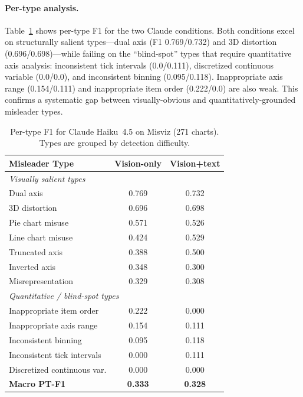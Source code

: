 \paragraph{Per-type analysis.}
Table~\ref{tab:pertype} shows per-type F1 for the two Claude conditions. Both conditions excel on structurally salient types---dual axis (F1 0.769/0.732) and 3D distortion (0.696/0.698)---while failing on the ``blind-spot'' types that require quantitative axis analysis: inconsistent tick intervals (0.0/0.111), discretized continuous variable (0.0/0.0), and inconsistent binning (0.095/0.118). Inappropriate axis range (0.154/0.111) and inappropriate item order (0.222/0.0) are also weak. This confirms a systematic gap between visually-obvious and quantitatively-grounded misleader types.

\begin{table}[h]
  \centering
  \caption{Per-type F1 for Claude Haiku~4.5 on Misviz (271 charts). Types are grouped by detection difficulty.}
  \label{tab:pertype}
  \small
  \begin{tabular}{lcc}
    \toprule
    Misleader Type & Vision-only & Vision+text \\
    \midrule
    \multicolumn{3}{l}{\textit{Visually salient types}} \\
    Dual axis              & 0.769 & 0.732 \\
    3D distortion          & 0.696 & 0.698 \\
    Pie chart misuse       & 0.571 & 0.526 \\
    Line chart misuse      & 0.424 & 0.529 \\
    Truncated axis         & 0.388 & 0.500 \\
    Inverted axis          & 0.348 & 0.300 \\
    Misrepresentation      & 0.329 & 0.308 \\
    \midrule
    \multicolumn{3}{l}{\textit{Quantitative / blind-spot types}} \\
    Inappropriate item order    & 0.222 & 0.000 \\
    Inappropriate axis range    & 0.154 & 0.111 \\
    Inconsistent binning        & 0.095 & 0.118 \\
    Inconsistent tick intervals & 0.000 & 0.111 \\
    Discretized continuous var. & 0.000 & 0.000 \\
    \midrule
    \textbf{Macro PT-F1}   & \textbf{0.333} & \textbf{0.328} \\
    \bottomrule
  \end{tabular}
\end{table}

